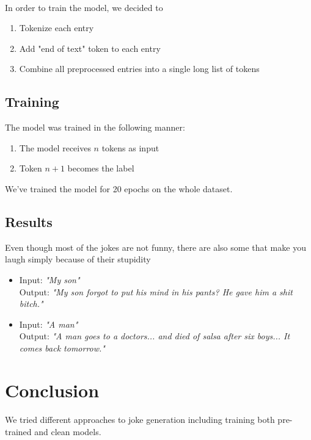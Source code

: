 \documentclass[12pt]{article}
\begin{document}
\paragraph{}
In order to train the model, we decided to
\begin{enumerate}
	\item Tokenize each entry
	\item Add "end of text" token to each entry
	\item Combine all preprocessed entries into a single long list of tokens
\end{enumerate}

\subsection{Training}

The model was trained in the following manner:
\begin{enumerate}
	\item The model receives $n$ tokens as input
	\item Token $n + 1$ becomes the label
\end{enumerate}

We've trained the model for 20 epochs on the whole dataset.

\subsection{Results}

Even though most of the jokes are not funny, there are also some that make you laugh simply because of their stupidity

\begin{itemize}
    \item Input: \textit{"My son"} \\
    Output: \textit{"My son forgot to put his mind in his pants? He gave him a shit bitch."}
    \item Input: \textit{"A man"} \\
    Output: \textit{"A man goes to a doctors... and died of salsa after six boys... It comes back tomorrow."}
\end{itemize}

\section{Conclusion}
\paragraph{}
We tried different approaches to joke generation including training both pre-trained and clean models.
\end{document}
